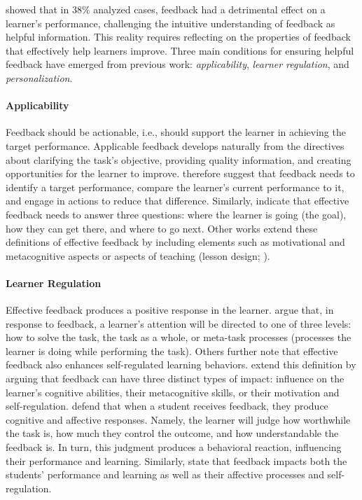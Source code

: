 \citet{kluger_effects_1996} showed that in $38\%$ analyzed cases, feedback had a detrimental effect on a learner's performance, challenging the intuitive understanding of feedback as helpful information. This reality requires reflecting on the properties of feedback that effectively help learners improve. Three main conditions for ensuring helpful feedback have emerged from previous work: \textit{applicability}, \textit{learner regulation}, and \textit{personalization}.


\paragraph{Applicability} Feedback should be actionable, i.e., should support the learner in achieving the target performance. Applicable feedback develops naturally from the directives about clarifying the task's objective, providing quality information, and creating opportunities for the learner to improve. \citet{sadler_formative_1989} therefore suggest that feedback needs to identify a target performance, compare the learner's current performance to it, and engage in actions to reduce that difference. Similarly, \citet{hattie_power_2007} indicate that effective feedback needs to answer three questions: where the learner is going (the goal), how they can get there, and where to go next. Other works extend these definitions of effective feedback by including elements such as motivational and metacognitive aspects \cite{nicol_formative_2006} or aspects of teaching (\eg lesson design; \citealp{evans_making_2013}). 


\paragraph{Learner Regulation} Effective feedback produces a positive response in the learner. \citet{kluger_effects_1996} argue that, in response to feedback, a learner's attention will be directed to one of three levels: how to solve the task, the task as a whole, or meta-task processes (processes the learner is doing while performing the task). Others \cite{nicol_formative_2006,evans_making_2013} further note that effective feedback also enhances self-regulated learning behaviors. \citet{narciss_how_2004, narciss_feedback_2008} extend this definition by arguing that feedback can have three distinct types of impact: influence on the learner's cognitive abilities, their metacognitive skills, or their motivation and self-regulation. \citet{anastasiya_a_lipnevich_david_a_g_berg_jeffrey_k_smith_toward_2016} defend that when a student receives feedback, they produce cognitive and affective responses. Namely, the learner will judge how worthwhile the task is, how much they control the outcome, and how understandable the feedback is. In turn, this judgment produces a behavioral reaction, influencing their performance and learning. Similarly, \citet{panadero_review_2022} state that feedback impacts both the students' performance and learning as well as their affective processes and self-regulation. 



